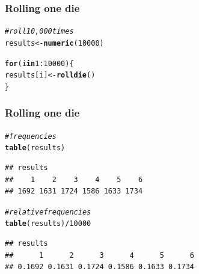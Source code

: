 \documentclass[12pt]{beamer}\usepackage[]{graphicx}\usepackage[]{color}
\makeatletter
\newcommand{\hlnum}[1]{\textcolor[rgb]{0.686,0.059,0.569}{#1}}%
\newcommand{\hlcom}[1]{\textcolor[rgb]{0.678,0.584,0.686}{\textit{#1}}}%
\newcommand{\hlopt}[1]{\textcolor[rgb]{0,0,0}{#1}}%
\newcommand{\hlstd}[1]{\textcolor[rgb]{0.345,0.345,0.345}{#1}}%
\newcommand{\hlkwa}[1]{\textcolor[rgb]{0.161,0.373,0.58}{\textbf{#1}}}%
\newcommand{\hlkwb}[1]{\textcolor[rgb]{0.69,0.353,0.396}{#1}}%
\newcommand{\hlkwd}[1]{\textcolor[rgb]{0.737,0.353,0.396}{\textbf{#1}}}%
\newenvironment{kframe}{%
 \def\at@end@of@kframe{}%
 \ifinner\ifhmode%
  \def\at@end@of@kframe{\end{minipage}}%
  \begin{minipage}{\columnwidth}%
 \fi\fi%
 \def\FrameCommand##1{\hskip\@totalleftmargin \hskip-\fboxsep
 \colorbox{shadecolor}{##1}\hskip-\fboxsep
     \hskip-\linewidth \hskip-\@totalleftmargin \hskip\columnwidth}%
 \MakeFramed {\advance\hsize-\width
   \@totalleftmargin\z@ \linewidth\hsize
   \@setminipage}}%
 {\par\unskip\endMakeFramed%
 \at@end@of@kframe}
\newenvironment{knitrout}{}{} %
\makeatother
\begin{document}

\begin{frame}[fragile]
\frametitle{Rolling one die}
\begin{knitrout}\footnotesize
{}\color{fgcolor}\begin{kframe}
\begin{alltt}
\hlcom{# roll 10,000 times}
\hlstd{results} \hlkwb{<-} \hlkwd{numeric}\hlstd{(}\hlnum{10000}\hlstd{)}

\hlkwa{for} \hlstd{(i} \hlkwa{in} \hlnum{1}\hlopt{:}\hlnum{10000}\hlstd{) \{}
  \hlstd{results[i]} \hlkwb{<-} \hlkwd{rolldie}\hlstd{()}
\hlstd{\}}
\end{alltt}
\end{kframe}
\end{knitrout}

\end{frame}


\begin{frame}[fragile]
\frametitle{Rolling one die}
\begin{knitrout}\footnotesize
{}\color{fgcolor}\begin{kframe}
\begin{alltt}
\hlcom{# frequencies}
\hlkwd{table}\hlstd{(results)}
\end{alltt}
\begin{verbatim}
## results
##    1    2    3    4    5    6 
## 1692 1631 1724 1586 1633 1734
\end{verbatim}
\begin{alltt}
\hlcom{# relative frequencies}
\hlkwd{table}\hlstd{(results)} \hlopt{/} \hlnum{10000}
\end{alltt}
\begin{verbatim}
## results
##      1      2      3      4      5      6 
## 0.1692 0.1631 0.1724 0.1586 0.1633 0.1734
\end{verbatim}
\end{kframe}
\end{knitrout}

\end{frame}

\end{document}
